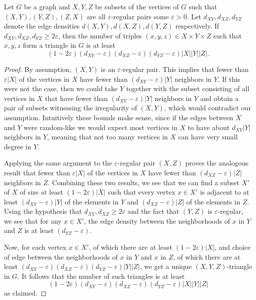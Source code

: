 \begin{theorem}
Let $G$ be a graph and $X,Y,Z$ be subsets of the vertices of $G$ such that $(X,Y),(Y,Z),(Z,X)$ are all $\varepsilon$-regular pairs some $\varepsilon>0$. Let $d_{XY},d_{XZ},d_{YZ}$ denote the edge densities $d(X,Y),d(X,Z),d(Y,Z)$ respectively. If $d_{XY},d_{XZ},d_{YZ}\geq2\varepsilon$, then the number of triples $(x,y,z)\in X\times Y\times Z$ such that $x,y,z$ form a triangle in $G$ is at least
\[(1-2\varepsilon)(d_{XY}-\varepsilon)(d_{XZ}-\varepsilon)(d_{YZ}-\varepsilon)|X||Y||Z|.\]
\end{theorem}
\begin{proof}
By assumption, $(X,Y)$ is an $\varepsilon$-regular pair. This implies that fewer than $\varepsilon|X|$ of the vertices in $X$ have fewer than $(d_{XY}-\varepsilon)|Y|$ neighbors in $Y$. If this were not the case, then we could take $Y$ together with the subset consisting of all vertices in $X$ that have fewer than $(d_{XY}-\varepsilon)|Y|$ neighbors in $Y$ and obtain a pair of subsets witnessing the irregularity of $(X,Y)$, which would contradict our assumption. Intuitively these bounds make sense, since if the edges between $X$ and $Y$ were random-like we would expect most vertices in $X$ to have about $d_{XY}|Y|$ neighbors in $Y$, meaning that not too many vertices in $X$ can have very small degree in $Y$.

Applying the same argument to the $\varepsilon$-regular pair $(X,Z)$ proves the analogous result that fewer than $\varepsilon|X|$ of the vertices in $X$ have fewer than $(d_{XZ}-\varepsilon)|Z|$ neighbors in $Z$. Combining these two results, we see that we can find a subset $X'$ of $X$ of size at least $(1-2\varepsilon)|X|$ such that every vertex $x\in X'$ is adjacent to at least $(d_{XY}-\varepsilon)|Y|$ of the elements in $Y$ and $(d_{XZ}-\varepsilon)|Z|$ of the elements in $Z$. Using the hypothesis that $d_{XY},d_{XZ}\geq2\varepsilon$ and the fact that $(Y,Z)$ is $\varepsilon$-regular, we see that for any $x\in X'$, the edge density between the neighborhoods of $x$ in $Y$ and $Z$ is at least $(d_{YZ}-\varepsilon)$.

Now, for each vertex $x\in X'$, of which there are at least $(1-2\varepsilon)|X|$, and choice of edge between the neighborhoods of $x$ in $Y$ and $x$ in $Z$, of which there are at least $(d_{XY}-\varepsilon)(d_{XZ}-\varepsilon)(d_{YZ}-\varepsilon)|Y||Z|$, we get a unique $(X,Y,Z)$-triangle in $G$. It follows that the number of such triangles is at least
\[(1-2\varepsilon)(d_{XY}-\varepsilon)(d_{XZ}-\varepsilon)(d_{YZ}-\varepsilon)|X||Y||Z|\]
as claimed.
\end{proof}

